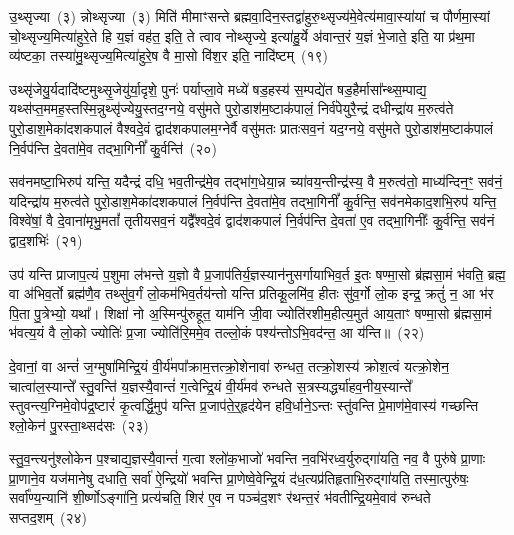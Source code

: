 {\anuvakamend[{उ॒दच॒त्युद्ये\-ऽह॑रा॒प्त्वा पञ्च॑दश च}]}%

उ॒थ्सृज्या~(३) न्नोथ्सृज्या~(३) मिति॑ मीमाꣳसन्ते ब्रह्मवा॒दिन॒स्तद्वा॑हुरु॒थ्सृज्य॑मे॒वेत्य॑मावा॒स्या॑यां च पौर्णमा॒स्यां चो॒थ्सृज्य॒मित्या॑हुरे॒ते हि य॒ज्ञं वह॑त॒ इति॒ ते त्वाव नोथ्सृज्ये॒ इत्या॑हु॒र्ये अ॑वान्त॒रं य॒ज्ञं भे॒जाते॒ इति॒ या प्र॑थ॒मा व्य॑ष्टका॒ तस्या॑मु॒थ्सृज्य॒मित्या॑हुरे॒ष वै मा॒सो वि॑श॒र इति॒ नादि॑ष्टम्~(१९)

उथ्सृ॑जेयु॒र्यदादि॑ष्टमुथ्सृ॒जेयु॑र्या॒दृशे॒ पुनः॑ पर्याप्ला॒वे मध्ये॑ षड॒हस्य॑ स॒म्पद्ये॑त षड॒हैर्मासा᳚न्थ्स॒म्पाद्य॒ यथ्स॑प्त॒ममह॒\-स्तस्मि॒न्नुथ्सृ॑ज्येयु॒स्तद॒ग्नये॒ वसु॑मते पुरो॒डाश॑\-म॒ष्टा\-क॑पालं॒ निर्व॑पेयुरै॒न्द्रं दधीन्द्रा॑य म॒रुत्व॑ते पुरो॒डाश॒मेका॑\-दश\-कपालं वैश्वदे॒वं द्वाद॑श\-कपालम॒ग्नेर्वै वसु॑मतः प्रातःसव॒नं यद॒ग्नये॒ वसु॑मते पुरो॒डाश॑\-म॒ष्टाक॑पालं नि॒र्वप॑न्ति दे॒वता॑मे॒व तद्भा॒गिनीं᳚ कु॒र्वन्ति॑~(२०)

सव॑नमष्टा॒भिरुप॑ यन्ति॒ यदैन्द्रं दधि॒ भव॒तीन्द्र॑मे॒व तद्भा॑ग॒धेया॒न्न च्या॑वय॒न्तीन्द्र॑स्य॒ वै म॒रुत्व॑तो॒ माध्य॑न्दिन॒ꣳ॒ सव॑नं॒ यदिन्द्रा॑य म॒रुत्व॑ते पुरो॒डाश॒मेका॑\-दश\-कपालं नि॒र्वप॑न्ति दे॒वता॑मे॒व तद्भा॒गिनीं᳚ कु॒र्वन्ति॒ सव॑नमेकाद॒शभि॒रुप॑ यन्ति॒ विश्वे॑षां॒ वै दे॒वाना॑मृभु॒मतां᳚ तृतीयसव॒नं यद्वै᳚श्वदे॒वं द्वाद॑श\-कपालं नि॒र्वप॑न्ति दे॒वता॑ ए॒व तद्भा॒गिनीः᳚ कु॒र्वन्ति॒ सव॑नं द्वाद॒शभिः॑~(२१)

उप॑ यन्ति प्राजाप॒त्यं प॒शुमा ल॑भन्ते य॒ज्ञो वै प्र॒जा\-प॑तिर्य॒ज्ञस्यान॑नुसर्गायाभिव॒र्त इ॒तः षण्मा॒सो ब्र॑ह्मसा॒मं भ॑वति॒ ब्रह्म॒ वा अ॑भिव॒र्तो ब्रह्म॑णै॒व तथ्सु॑व॒र्गं लो॒कम॑भिव॒र्तय॑न्तो यन्ति प्रतिकू॒लमि॑व॒ हीतः सु॑व॒र्गो लो॒क इन्द्र॒ क्रतुं॑ न॒ आ भ॑र पि॒ता पु॒त्रेभ्यो॒ यथा᳚। शिक्षा॑ नो अ॒स्मिन्पु॑रुहूत॒ याम॑नि जी॒वा ज्योति॑रशीम॒हीत्य॒मुत॑ आय॒ताꣳ षण्मा॒सो ब्र॑ह्मसा॒मं भ॑वत्य॒यं वै लो॒को ज्योतिः॑ प्र॒जा ज्योति॑रि॒ममे॒व तल्लो॒कं पश्य॑न्तो\-ऽभि॒वद॑न्त॒ आ य॑न्ति॥~(२२)

{\anuvakamend[{नादि॑ष्टङ्कु॒र्वन्ति॑ द्वाद॒शभि॒रिति॑ विꣳश॒तिश्च॑}]}%

दे॒वानां॒ वा अन्तं॑ ज॒ग्मुषा॑मिन्द्रि॒यं वी॒र्य॑मपा᳚क्राम॒त्तत्क्रो॒शेनावा॑ रुन्धत॒ तत्क्रो॒शस्य॑ क्रोश॒त्वं यत्क्रो॒शेन॒ चात्वा॑ल॒स्यान्ते᳚ स्तु॒वन्ति॑ य॒ज्ञस्यै॒वान्तं॑ ग॒त्वेन्द्रि॒यं वी॒र्य॑मव॑ रुन्धते स॒त्रस्यर्द्ध्या॑हव॒नीय॒स्यान्ते᳚ स्तुवन्त्य॒ग्निमे॒वोप॑द्र॒ष्टारं॑ कृ॒त्वर्द्धि॒मुप॑ यन्ति प्र॒जा\-प॑ते॒र्॒\mbox{}हृद॑येन हवि॒र्धाने॒\-ऽन्तः स्तु॑वन्ति प्रे॒माण॑मे॒वास्य॑ गच्छन्ति श्लो॒केन॑ पु॒रस्ता॒थ्सद॑सः~(२३)

स्तु॒व॒न्त्यनु॑श्लोकेन प॒श्चाद्य॒ज्ञस्यै॒वान्तं॑ ग॒त्वा श्लो॑क॒भाजो॑ भवन्ति न॒वभि॑रध्व॒र्युरुद्गा॑यति॒ नव॒ वै पुरु॑षे प्रा॒णाः प्रा॒णाने॒व यज॑मानेषु दधाति॒ सर्वा॑ ऐ॒न्द्रियो॑ भवन्ति प्रा॒णेष्वे॒वेन्द्रि॒यं द॑ध॒त्यप्र॑तिहृताभि॒रुद्गा॑यति॒ तस्मा॒त्पुरु॑षः॒ सर्वा᳚ण्य॒न्यानि॑ शी॒र्ष्णो\-ऽङ्गा॑नि॒ प्रत्य॑चति॒ शिर॑ ए॒व न पञ्च॑द॒शꣳ र॑थन्त॒रं भ॑वतीन्द्रि॒यमे॒वाव॑ रुन्धते सप्तद॒शम्~(२४)

